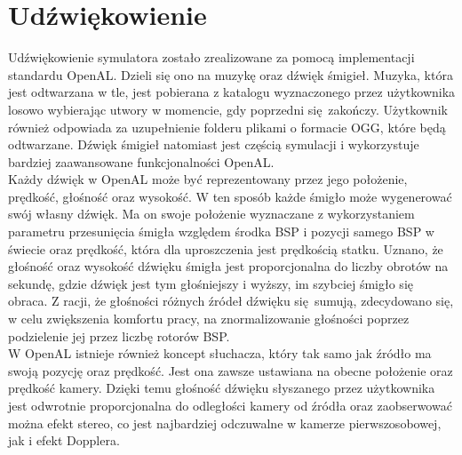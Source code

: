 \section{Udźwiękowienie} \label{audio}

Udźwiękowienie symulatora zostało zrealizowane za pomocą implementacji standardu OpenAL. Dzieli się ono na muzykę oraz dźwięk śmigieł. Muzyka, która jest odtwarzana w tle, jest pobierana z katalogu wyznaczonego przez użytkownika losowo wybierając utwory w momencie, gdy poprzedni się zakończy. Użytkownik również odpowiada za uzupełnienie folderu plikami o formacie OGG, które będą odtwarzane. Dźwięk śmigieł natomiast jest częścią symulacji i wykorzystuje bardziej zaawansowane funkcjonalności OpenAL. 
\\

Każdy dźwięk w OpenAL może być reprezentowany przez jego położenie, prędkość, głośność oraz wysokość. W ten sposób każde śmigło może wygenerować swój własny dźwięk. Ma on swoje położenie wyznaczane z wykorzystaniem parametru przesunięcia śmigła względem środka BSP i pozycji samego BSP w świecie oraz prędkość, która dla uproszczenia jest prędkością statku. Uznano, że głośność oraz wysokość dźwięku śmigła jest proporcjonalna do liczby obrotów na sekundę, gdzie dźwięk jest tym głośniejszy i wyższy, im szybciej śmigło się obraca. Z racji, że głośności różnych źródeł dźwięku się sumują, zdecydowano się, w celu zwiększenia komfortu pracy, na znormalizowanie głośności poprzez podzielenie jej przez liczbę rotorów BSP. 
\\

W OpenAL istnieje również koncept słuchacza, który tak samo jak źródło ma swoją pozycję oraz prędkość. Jest ona zawsze ustawiana na obecne położenie oraz prędkość kamery. Dzięki temu głośność dźwięku słyszanego przez użytkownika jest odwrotnie proporcjonalna do odległości kamery od źródła oraz zaobserwować można efekt stereo, co jest najbardziej odczuwalne w kamerze pierwszosobowej, jak i efekt Dopplera.
\\